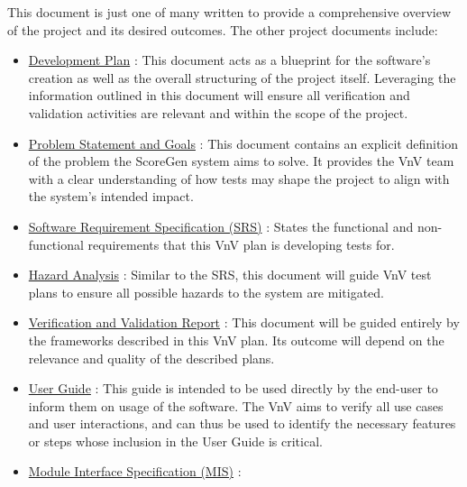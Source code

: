 \documentclass[12pt, titlepage]{article}
\begin{document}
This document is just one of many written to provide a comprehensive overview of the project and its desired 
outcomes. The other project documents include:
\begin{itemize}
  \item \href{https://github.com/emilyperica/ScoreGen/blob/main/docs/DevelopmentPlan/DevelopmentPlan.pdf}{Development Plan} \citep*{ScoreGenDP}: 
  This document acts as a blueprint for the software’s creation as well as the overall structuring of the project itself. Leveraging the information 
  outlined in this document will ensure all verification and validation activities are relevant and within the scope of the project.
  \item \href{https://github.com/emilyperica/ScoreGen/blob/main/docs/ProblemStatementAndGoals/ProblemStatement.pdf}{Problem Statement and Goals} \citep*{ScoreGenPS}:
  This document contains an explicit definition of the problem the ScoreGen system aims to solve. It provides the VnV team with a clear understanding of how 
  tests may shape the project to align with the system’s intended impact.
  \item \href{https://github.com/emilyperica/ScoreGen/blob/main/docs/SRS-Volere/SRS.pdf}{Software Requirement Specification (SRS)} \citep*{ScoreGenSRS}:
  States the functional and non-functional requirements that this VnV plan is developing tests for.
  \item \href{https://github.com/emilyperica/ScoreGen/blob/main/docs/HazardAnalysis/HazardAnalysis.pdf}{Hazard Analysis} \citep*{ScoreGenHA}:
  Similar to the SRS, this document will guide VnV test plans to ensure all possible hazards to the system are mitigated.
  \item \href{https://github.com/emilyperica/ScoreGen/blob/main/docs/VnVReport/VnVReport.pdf}{Verification and Validation Report} \citep*{ScoreGenVnVReport}:
  This document will be guided entirely by the frameworks described in this VnV plan. Its outcome will depend on the relevance and quality of the described plans.
  \item \href{https://github.com/emilyperica/ScoreGen/blob/main/docs/UserGuide/UserGuide.pdf}{User Guide} \citep*{ScoreGenUG}:
  This guide is intended to be used directly by the end-user to inform them on usage of the software. The VnV aims to 
  verify all use cases and user interactions, and can thus be used to identify the necessary features or steps whose inclusion 
  in the User Guide is critical.
  \item \href{https://github.com/emilyperica/ScoreGen/blob/main/docs/Design/SoftDetailedDes/MIS.pdf}{Module Interface Specification (MIS)} \citep*{ScoreGenMIS}:

\end{itemize}
\end{document}
